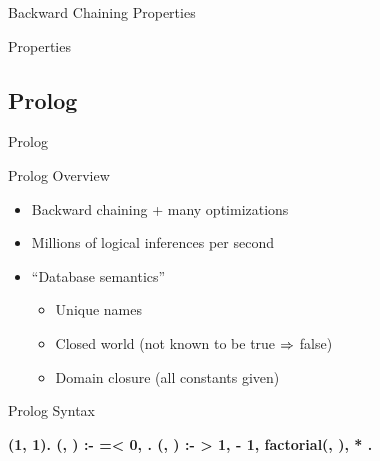 \documentclass[14pt]{beamer}
\begin{document}
\begin{frame}{Backward Chaining Properties}
\begin{block}{Properties}
\begin{description}[Complete?]
\item[Sound?]
\item[Complete?]
\item[Space?]
\end{description}
\end{block}
\bigskip
{}
\end{frame}

\subsection{Prolog}

\begin{frame}[fragile]{Prolog}
\begin{block}{Prolog Overview}
\begin{itemize}
\item Backward chaining + many optimizations
\item Millions of logical inferences per second
\item ``Database semantics''
\begin{itemize}
\item Unique names
\item Closed world (not known to be true $\Rightarrow$ false)
\item Domain closure (all constants given)
\end{itemize}
\end{itemize}
\end{block}
\pause
\begin{block}{Prolog Syntax}
\begin{semiverbatim}\bfseries\footnotesize
{}(1, 1).
(, \str{_}) :-  =< 0, .
(, ) :-  > 1,    - 1,
                   factorial(, ),    * .
\end{semiverbatim}
\end{block}
\end{frame}
\end{document}
